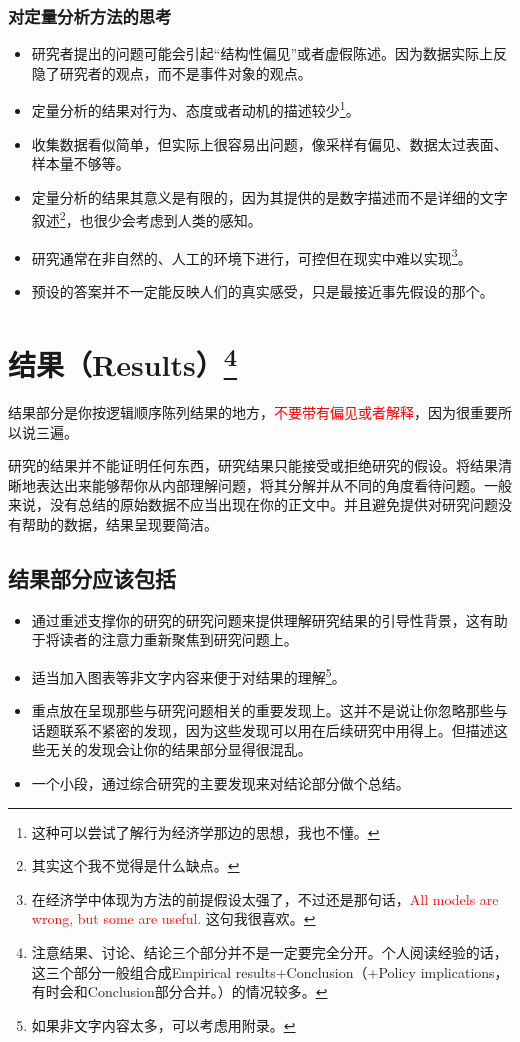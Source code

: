\documentclass[cn,hazy,blue,14pt,screen]{elegantnote} %
\begin{document}
\subsubsection{对定量分析方法的思考}

\begin{itemize}
  \item 研究者提出的问题可能会引起“结构性偏见”或者虚假陈述。因为数据实际上反隐了研究者的观点，而不是事件对象的观点。
  \item 定量分析的结果对行为、态度或者动机的描述较少\footnote{这种可以尝试了解行为经济学那边的思想，我也不懂。}。
  \item 收集数据看似简单，但实际上很容易出问题，像采样有偏见、数据太过表面、样本量不够等。
  \item 定量分析的结果其意义是有限的，因为其提供的是数字描述而不是详细的文字叙述\footnote{其实这个我不觉得是什么缺点。}，也很少会考虑到人类的感知。
  \item 研究通常在非自然的、人工的环境下进行，可控但在现实中难以实现\footnote{在经济学中体现为方法的前提假设太强了，不过还是那句话，\textcolor{red}{All models are wrong, but some are useful. }这句我很喜欢。}。
  \item 预设的答案并不一定能反映人们的真实感受，只是最接近事先假设的那个。
\end{itemize}

\newpage

\section{结果（Results）\footnote{注意结果、讨论、结论三个部分并不是一定要完全分开。个人阅读经验的话，这三个部分一般组合成Empirical results+Conclusion（+Policy implications，有时会和Conclusion部分合并。）的情况较多。}}

结果部分是你按逻辑顺序陈列结果的地方，\textcolor{red}{不要带有偏见或者解释}，因为很重要所以说三遍。

研究的结果并不能证明任何东西，研究结果只能接受或拒绝研究的假设。将结果清晰地表达出来能够帮你从内部理解问题，将其分解并从不同的角度看待问题。一般来说，没有总结的原始数据不应当出现在你的正文中。并且避免提供对研究问题没有帮助的数据，结果呈现要简洁。

\subsection{结果部分应该包括}

\begin{itemize}
  \item 通过重述支撑你的研究的研究问题来提供理解研究结果的引导性背景，这有助于将读者的注意力重新聚焦到研究问题上。
  \item 适当加入图表等非文字内容来便于对结果的理解\footnote{如果非文字内容太多，可以考虑用附录。}。
  \item 重点放在呈现那些与研究问题相关的重要发现上。这并不是说让你忽略那些与话题联系不紧密的发现，因为这些发现可以用在后续研究中用得上。但描述这些无关的发现会让你的结果部分显得很混乱。
  \item 一个小段，通过综合研究的主要发现来对结论部分做个总结。
\end{itemize}
\end{document}
